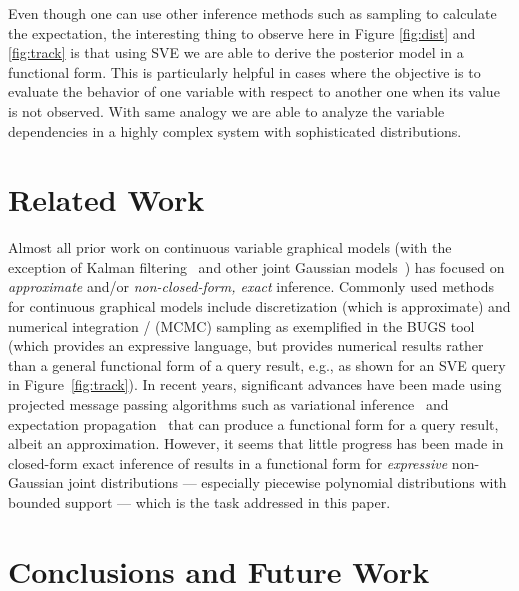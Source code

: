\documentclass[letterpaper]{article}
\begin{document}
{Even though one can use other inference methods such as sampling to calculate the expectation, the interesting thing to observe here in Figure \ref{fig:dist} and \ref{fig:track} is that using SVE we are able to derive the posterior model in a functional form. This is particularly helpful in cases where the objective is to evaluate the behavior of one variable with respect to another one when its value is not observed. With same analogy we are able to analyze the variable dependencies in a highly complex system with sophisticated distributions.



\section{Related Work}


Almost all prior work on continuous variable graphical models (with
the exception of Kalman filtering~\cite{kalman_filter} and other joint
Gaussian models~\cite{Weiss99correctnesof}) has focused on
\emph{approximate} and/or \emph{non-closed-form, exact} inference.
Commonly used methods for continuous graphical models include
discretization (which is approximate) and numerical integration /
(MCMC) sampling as exemplified in the BUGS tool~\cite{bugs} (which
provides an expressive language, but provides numerical results rather
than a general functional form of a query result, e.g., as shown for
an SVE query in Figure~\ref{fig:track}).  In recent years, significant
advances have been made using projected message passing algorithms
such as variational inference~\cite{variational} and expectation
propagation~\cite{minka_ep} that can produce a functional form for a
query result, albeit an approximation.  However, it seems that little
progress has been made in {closed-form exact} inference of
results in a functional form for \emph{expressive} non-Gaussian joint
distributions --- especially piecewise polynomial distributions with
bounded support --- which is the task addressed in this paper.

\section{Conclusions and Future Work}

}
\end{document}
